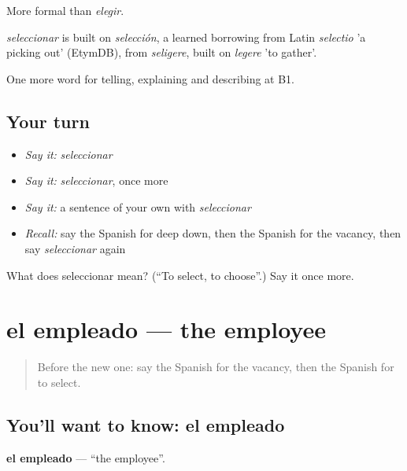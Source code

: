 More formal than \emph{elegir}.

\begin{cousinweb}
\emph{seleccionar} is built on \emph{selección}, a learned borrowing from Latin \emph{selectio} 'a picking out' (EtymDB), from \emph{seligere}, built on \emph{legere} 'to gather'.
\end{cousinweb}

\begin{grammarlens}[title={What you've built}]
One more word for telling, explaining and describing at B1.
\end{grammarlens}

\subsection*{Your turn}
\begin{itemize}
\raggedright
  \item \emph{Say it:} \emph{seleccionar}
  \item \emph{Say it:} \emph{seleccionar}, once more
  \item \emph{Say it:} a sentence of your own with \emph{seleccionar}
  \item \emph{Recall:} say the Spanish for deep down, then the Spanish for the vacancy, then say \emph{seleccionar} again
\end{itemize}

\begin{tcolorbox}[breakable,colback=teal!4,colframe=teal!35!black,title={Before you move on}]
What does seleccionar mean? (\textquotedblleft{}To select, to choose\textquotedblright{}.) Say it once more.
\end{tcolorbox}
\section[el empleado]{el empleado — the employee}

\label{lesson:ES-C590-empleado}



\begin{quote}
Before the new one: say the Spanish for the vacancy, then the Spanish for to select.
\end{quote}

\subsection*{You'll want to know: el empleado}
\textbf{el empleado} — \textquotedblleft{}the employee\textquotedblright{}.

